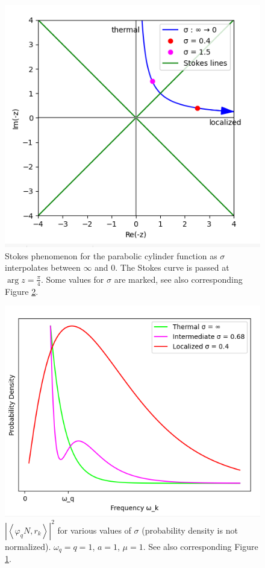 \documentclass[12pt,a4paper]{article}
\begin{document}
\begin{figure}[h]
\centering
\includegraphics[scale=0.5]{stokes.png}
\caption{Stokes phenomenon for the parabolic cylinder function as $\sigma$ interpolates between $\infty$ and $0$.  The Stokes curve is passed at $\arg z = \frac{\pi}{4}$. Some values for $\sigma$ are marked, see also corresponding Figure \ref{pcf_sigma_curves}.}
\label{stokes}
\end{figure}
\begin{figure}
\centering
\includegraphics[scale=0.5]{pcf.png}
\caption{$\left|\left< \varphi_q N, r_k \right>\right|^2$ for various values of $\sigma$ (probability density is not normalized). $\omega_q = q = 1$, $a=1$, $\mu = 1$. See also corresponding Figure \ref{stokes}.}
\label{pcf_sigma_curves}
\end{figure}
\end{document}

